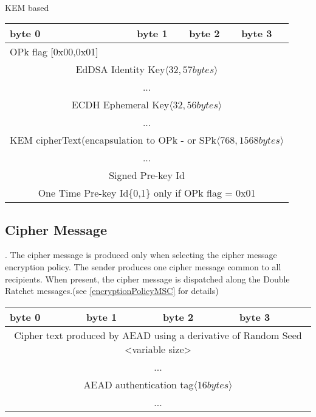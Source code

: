 \documentclass[a4paper,11pt]{article}
\begin{document}
      \paragraph*{}KEM based
      \begin{center}
      \begin{tabular}{ | p{1.4in} | p{1.4in} | p{1.4in} | p{1.4in} |}
        \hline
        \cellcolor[gray]{0.85} byte 0 & \cellcolor[gray]{0.85} byte 1 & \cellcolor[gray]{0.85} byte 2 & \cellcolor[gray]{0.85}byte 3\\
        \hline
        OPk flag [0x00,0x01]&\multicolumn{3}{|c|}{}\\
        \cline{1-1}
        \multicolumn{4}{|c|}{EdDSA Identity Key$\langle 32,57bytes\rangle $}\\
        \multicolumn{4}{|c|}{...}\\
        \hline
        \multicolumn{4}{|c|}{ ECDH Ephemeral Key$\langle 32,56bytes\rangle $}\\
        \multicolumn{4}{|c|}{...}\\
        \hline
        \multicolumn{4}{|c|}{ KEM cipherText(encapsulation to OPk - or SPk$\langle 768,1568 bytes\rangle $}\\
        \multicolumn{4}{|c|}{...}\\
        \hline
        \multicolumn{4}{|c|}{Signed Pre-key Id}\\
        \hline
        \multicolumn{4}{|c|}{One Time Pre-key Id\{0,1\} only if OPk flag = 0x01}\\
        \hline
      \end{tabular}
      \end{center}

  \subsection{Cipher Message}. The cipher message is produced only when selecting the cipher message encryption policy. The sender produces one cipher message common to all recipients. When present, the cipher message is dispatched along the Double Ratchet messages.(see \ref{encryptionPolicyMSC} for details)
      \begin{center}
      \begin{tabular}{ | p{1.4in} | p{1.4in} | p{1.4in} | p{1.4in} |}
        \hline
        \cellcolor[gray]{0.85} byte 0 & \cellcolor[gray]{0.85} byte 1 & \cellcolor[gray]{0.85} byte 2 & \cellcolor[gray]{0.85}byte 3\\
        \hline
        \multicolumn{4}{|c|}{Cipher text produced by AEAD using a derivative of Random Seed <variable size>}\\
        \multicolumn{4}{|c|}{...}\\
        \hline
        \multicolumn{4}{|c|}{AEAD authentication tag$\langle 16bytes\rangle $}\\
        \multicolumn{4}{|c|}{...}\\
        \hline
      \end{tabular}
      \end{center}
\end{document}
